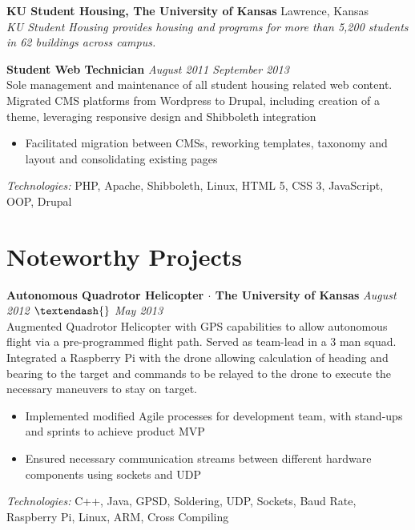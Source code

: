 \documentclass[10pt]{article}
\begin{document}
\textbf{KU Student Housing, The University of Kansas} \hfill Lawrence, Kansas \\
\textit{KU Student Housing provides housing and programs for more than 5,200 students in 62 buildings across campus.} \\
\begin{addmargin}[1em]{0em}
  \textbf{Student Web Technician} \hfill \textit{August 2011 {\textendash{}} September 2013} \\
  Sole management and maintenance of all student housing related web content. Migrated CMS platforms from Wordpress to Drupal, including creation of a theme, leveraging responsive design and Shibboleth integration \\
  \vspace{-1em}
  \begin{itemize}
    \item Facilitated migration between CMSs, reworking templates, taxonomy and layout and consolidating existing pages
  \end{itemize}
  \textit{Technologies:} PHP, Apache, Shibboleth, Linux, HTML 5, CSS 3, JavaScript, OOP, Drupal
\end{addmargin}

\section*{Noteworthy Projects}
\textbf{Autonomous Quadrotor Helicopter $\cdot$ The University of Kansas} \hfill \textit{August 2012  $\textendash{}$ May 2013} \\
Augmented Quadrotor Helicopter with GPS capabilities to allow autonomous flight via a pre-programmed flight path. Served as team-lead in a 3 man squad. Integrated a Raspberry Pi with the drone allowing calculation of heading and bearing to the target and commands to be relayed to the drone to execute the necessary maneuvers to stay on target.
\begin{itemize}
  \item Implemented modified Agile processes for development team, with stand-ups and sprints to achieve product MVP
  \item Ensured necessary communication streams between different hardware components using sockets and UDP
\end{itemize}
\textit{Technologies:} C++, Java, GPSD, Soldering, UDP, Sockets, Baud Rate, Raspberry Pi, Linux, ARM, Cross Compiling
\end{document}
